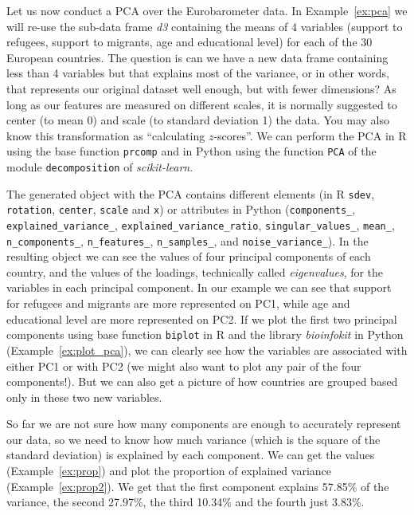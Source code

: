 Let us now conduct a PCA over the Eurobarometer data.  In Example~\ref{ex:pca} we will re-use the sub-data frame \emph{d3} containing the means of 4 variables (support to refugees, support to migrants, age and educational level) for each of the 30 European countries. The question is  can we have a new data frame containing less than 4 variables but that explains most of the variance, or in other words, that represents our original dataset well enough, but with fewer dimensions? As long as our features are measured on different scales, it is normally suggested to center (to mean 0) and scale (to standard deviation 1) the data. You may also know this transformation as ``calculating $z$-scores''. We can perform the PCA in R using the base function \texttt{prcomp} and in Python using the function \texttt{PCA} of the module \texttt{decomposition} of \emph{scikit-learn}.


The generated object with the PCA contains different elements (in R \texttt{sdev}, \texttt{rotation}, \texttt{center}, \texttt{scale} and \texttt{x}) or attributes in Python (\texttt{components\_}, \texttt{explained\_variance\_}, \texttt{explained\_variance\_ratio}, \texttt{singular\_values\_}, \texttt{mean\_}, \texttt{n\_components\_}, \texttt{n\_features\_}, \texttt{n\_samples\_}, and \texttt{noise\_variance\_}). In the resulting object we can see the values of four principal components of each country, and the values of the loadings, technically called \textit{eigenvalues}, for the variables in each principal component.  In our example we can see that support for refugees and migrants are more represented on PC1, while age and educational level are more represented on PC2. If we plot the first two principal components using base function \texttt{biplot} in R and the library \emph{bioinfokit} in Python (Example~\ref{ex:plot_pca}), we can clearly see how the variables are associated with either PC1 or with PC2 (we might also want to plot any pair of the four components!). But we can also get a picture of how countries are grouped based only in these two new variables.


So far we are not sure  how many components are enough to accurately represent our data, so we need to know how much variance (which is the square of the standard deviation) is explained by each component. We can get the values (Example~\ref{ex:prop}) and plot  the proportion of explained variance (Example~\ref{ex:prop2}). We get that the first component explains 57.85\% of the variance, the second 27.97\%, the third 10.34\% and the fourth just 3.83\%.

